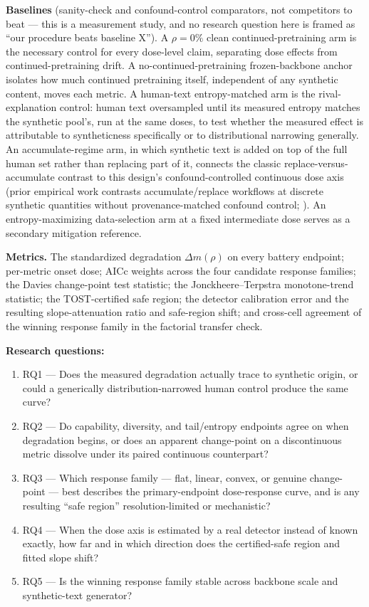 \documentclass[11pt]{article}
\begin{document}
\textbf{Baselines} (sanity-check and confound-control comparators, not competitors to beat --- this is a measurement study, and no research question here is framed as ``our procedure beats baseline X''). A $\rho = 0\%$ clean continued-pretraining arm is the necessary control for every dose-level claim, separating dose effects from continued-pretraining drift. A no-continued-pretraining frozen-backbone anchor isolates how much continued pretraining itself, independent of any synthetic content, moves each metric. A human-text entropy-matched arm is the rival-explanation control: human text oversampled until its measured entropy matches the synthetic pool's, run at the same doses, to test whether the measured effect is attributable to syntheticness specifically or to distributional narrowing generally. An accumulate-regime arm, in which synthetic text is added on top of the full human set rather than replacing part of it, connects the classic replace-versus-accumulate contrast to this design's confound-controlled continuous dose axis (prior empirical work contrasts accumulate/replace workflows at discrete synthetic quantities without provenance-matched confound control; \citealp{KazdanCollapseThrive}). An entropy-maximizing data-selection arm at a fixed intermediate dose serves as a secondary mitigation reference.

\textbf{Metrics.} The standardized degradation $\Delta m(\rho)$ on every battery endpoint; per-metric onset dose; AICc weights across the four candidate response families; the Davies change-point test statistic; the Jonckheere--Terpstra monotone-trend statistic; the TOST-certified safe region; the detector calibration error and the resulting slope-attenuation ratio and safe-region shift; and cross-cell agreement of the winning response family in the factorial transfer check.

\textbf{Research questions:}
\begin{enumerate}[leftmargin=1.6em]
\item RQ1 --- Does the measured degradation actually trace to synthetic origin, or could a generically distribution-narrowed human control produce the same curve?
\item RQ2 --- Do capability, diversity, and tail/entropy endpoints agree on when degradation begins, or does an apparent change-point on a discontinuous metric dissolve under its paired continuous counterpart?
\item RQ3 --- Which response family --- flat, linear, convex, or genuine change-point --- best describes the primary-endpoint dose-response curve, and is any resulting ``safe region'' resolution-limited or mechanistic?
\item RQ4 --- When the dose axis is estimated by a real detector instead of known exactly, how far and in which direction does the certified-safe region and fitted slope shift?
\item RQ5 --- Is the winning response family stable across backbone scale and synthetic-text generator?
\end{enumerate}
\end{document}
